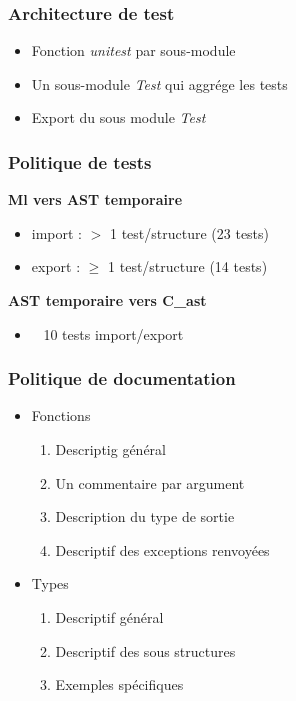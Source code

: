 \documentclass{beamer}
\begin{document}
\begin{frame}
    \frametitle{Architecture de test}

    \begin{itemize}
        \item Fonction \textit{unitest} par sous-module
        \item Un sous-module \textit{Test} qui aggrége les tests
        \item Export du sous module \textit{Test}    
    \end{itemize}            
\end{frame}

\begin{frame}
    \frametitle{Politique de tests}

    \textbf{Ml vers AST temporaire}
    \begin{itemize}
        \item import : $>$ 1 test/structure (23 tests)
        \item export : $\ge$ 1 test/structure (14 tests)
    \end{itemize}        

    \textbf{AST temporaire vers C\_ast}
    \begin{itemize}
        \item ~ 10 tests import/export
    \end{itemize}        
\end{frame}    

\begin{frame}
    \frametitle{Politique de documentation}
    
    \begin{itemize}
        \item Fonctions
            \begin{enumerate}
                \item Descriptig général
                \item Un commentaire par argument
                \item Description du type de sortie
                \item Descriptif des exceptions renvoyées    
            \end{enumerate}
        \item Types
            \begin{enumerate}
                \item Descriptif général
                \item Descriptif des sous structures     
                \item Exemples spécifiques    
            \end{enumerate}       
    \end{itemize}
\end{frame}    
\end{document}
